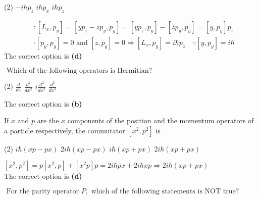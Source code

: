 \begin{enumerate}
\begin{minipage}{\textwidth}
\end{minipage}
\begin{tasks}(2)
	\task[\textbf{A.}] $-i \hbar p_{z}$
	\task[\textbf{C.}]$i \hbar p_{x}$
	\task[\textbf{D.}]$i \hbar p_{z}$
\end{tasks}
\begin{answer}
\begin{align*}
	&:\left[L_{x}, p_{y}\right]=\left[y p_{z}-z p_{y}, p_{y}\right]=\left[y p_{z}, p_{y}\right]-\left[z p_{y}, p_{y}\right]=\left[y, p_{y}\right] p_{z} \\
	&\cdot\left[p_{y}, p_{y}\right]=0 \text { and }\left[z, p_{y}\right]=0 \Rightarrow\left[L_{x}, p_{y}\right]=i \hbar p_{z} \quad \because\left[y, p_{y}\right]=i \hbar
\end{align*}
The correct option is \textbf{(d)}	
\end{answer}
\begin{minipage}{\textwidth}
	\item $\text { Which of the following operators is Hermitian? }$
\end{minipage}
\begin{tasks}(2)
	\task[\textbf{A.}] $\frac{d}{d x}$
	\task[\textbf{B.}]$\frac{d^{2}}{d x^{2}}$
	\task[\textbf{C.}]$i \frac{d^{2}}{d x^{2}}$
	\task[\textbf{D.}]$\frac{d^{3}}{d x^{3}}$
\end{tasks}
\begin{answer}
	The correct option is \textbf{(b)}
\end{answer}
\begin{minipage}{\textwidth}
	\item If $x$ and $p$ are the $x$ components of the position and the momentum operators of a particle respectively, the commutator $\left[x^{2}, p^{2}\right]$ is
\end{minipage}
\begin{tasks}(2)
	\task[\textbf{A.}] $i \hbar(x p-p x)$
	\task[\textbf{B.}]$2 i \hbar(x p-p x)$
	\task[\textbf{C.}]$i \hbar(x p+p x)$
	\task[\textbf{D.}]$2 i \hbar(x p+p x)$
\end{tasks}\begin{answer}
$\left[x^{2}, p^{2}\right]=p\left[x^{2}, p\right]+\left[x^{2} p\right] p=2 i \hbar p x+2 i \hbar x p \Rightarrow 2 i \hbar(x p+p x)$\\
The correct option is \textbf{(d)}
\end{answer}
\begin{minipage}{\textwidth}
	\item $\text { For the parity operator } P, \text { which of the following statements is NOT true? }$

\end{minipage}
\end{enumerate}
